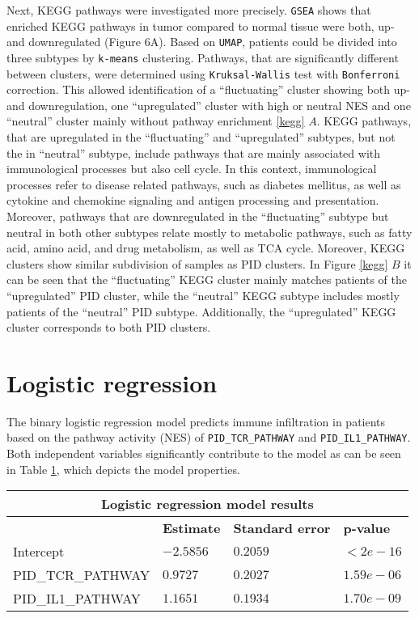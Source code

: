 \documentclass[
  parskip,
  oneside]{scrreprt}
\begin{document}
Next, KEGG pathways were investigated more precisely. \texttt{GSEA}
shows that enriched KEGG pathways in tumor compared to normal tissue
were both, up- and downregulated (Figure 6A). Based on \texttt{UMAP},
patients could be divided into three subtypes by \texttt{k-means}
clustering. Pathways, that are significantly different between clusters,
were determined using \texttt{Kruksal-Wallis} test with
\texttt{Bonferroni} correction. This allowed identification of a
``fluctuating'' cluster showing both up- and downregulation, one
``upregulated'' cluster with high or neutral NES and one ``neutral''
cluster mainly without pathway enrichment \cref{kegg} \(A\). KEGG
pathways, that are upregulated in the ``fluctuating'' and
``upregulated'' subtypes, but not the in ``neutral'' subtype, include
pathways that are mainly associated with immunological processes but
also cell cycle. In this context, immunological processes refer to
disease related pathways, such as diabetes mellitus, as well as cytokine
and chemokine signaling and antigen processing and presentation.\\
Moreover, pathways that are downregulated in the ``fluctuating'' subtype
but neutral in both other subtypes relate mostly to metabolic pathways,
such as fatty acid, amino acid, and drug metabolism, as well as TCA
cycle. Moreover, KEGG clusters show similar subdivision of samples as
PID clusters. In Figure \cref{kegg} \(B\) it can be seen that the
``fluctuating'' KEGG cluster mainly matches patients of the
``upregulated'' PID cluster, while the ``neutral'' KEGG subtype includes
mostly patients of the ``neutral'' PID subtype. Additionally, the
``upregulated'' KEGG cluster corresponds to both PID clusters.

\hypertarget{logistic-regression}{%
\section{Logistic regression}\label{logistic-regression}}

The binary logistic regression model predicts immune infiltration in
patients based on the pathway activity (NES) of
\texttt{PID\_TCR\_PATHWAY} and \texttt{PID\_IL1\_PATHWAY}. Both
independent variables significantly contribute to the model as can be
seen in Table \cref{tab}, which depicts the model properties.

\begin{table}[ht]
 \begin{tabular}{ |p{4.5cm}||p{3cm}|p{3cm}|p{3cm}|  }
  \hline
  \multicolumn{4}{|c|}{Logistic regression model results} \\
  \hline
   & \textbf{Estimate} & \textbf{Standard error} & \textbf{p-value}\\
  \hline
  Intercept   &  $-2.5856$  & $0.2059$ &   $<2e-16$\\
  PID\_TCR\_PATHWAY &   $0.9727$  & $0.2027$   & $1.59e-06$\\
  PID\_IL1\_PATHWAY & $1.1651$ & $0.1934$ &  $1.70e-09$\\
 \hline
 \end{tabular}
 \label{tab}
\end{table}
\end{document}

